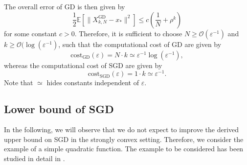 \documentclass[12pt,openany]{book}
\theoremstyle{definition}
\theoremstyle{definition}
\newcommand{\cO}{\mathcal{O}}
\newcommand{\E}{\mathbb{E}}
\begin{document}
The overall error of GD is then given by
\[\frac12\E[ \|X_{k,N}^{\mathrm{GD}} - x_\ast\|^2]\le c(\frac1N + \rho^{k}) \]
for some constant $c>0$. Therefore, it is sufficient to choose $N\ge \cO(\varepsilon^{-1})$ and $k\ge\cO(\log(\varepsilon^{-1})$, such that the computational cost of GD are given by
\[{\mathrm{cost}}_{\mathrm{GD}} (\varepsilon) = N\cdot k \simeq  \varepsilon^{-1}\log(\varepsilon^{-1}),\] 
whereas the computational cost of SGD are given by
\[{\mathrm{cost}}_{\mathrm{SGD}}(\varepsilon) = 1\cdot k \simeq \varepsilon^{-1}. \]
Note that $\simeq$ hides constants independent of $\varepsilon$.

\subsection{Lower bound of SGD}

In the following, we will observe that we do not expect to improve the derived upper bound on SGD in the strongly convex setting. Therefore, we consider the example of a simple quadratic function. The example to be considered has been studied in detail in \cite{JENTZEN2020101438}.
\end{document}
